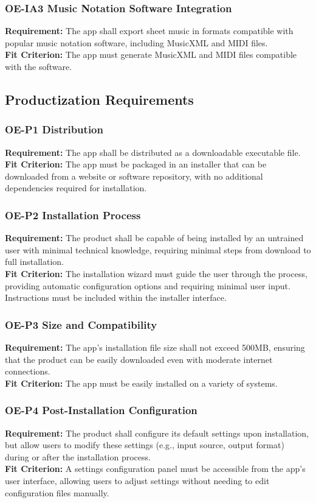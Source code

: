 \documentclass[12pt]{article}
\begin{document}
\subsubsection*{OE-IA3 Music Notation Software Integration}
\textbf{Requirement:} The app shall export sheet music in formats compatible with popular music notation software, including MusicXML and MIDI files.\\
\textbf{Fit Criterion:} The app must generate MusicXML and MIDI files compatible with the software.\\

\subsection{Productization Requirements}
\subsubsection*{OE-P1 Distribution}
\textbf{Requirement:} The app shall be distributed as a downloadable executable file.\\
\textbf{Fit Criterion:} The app must be packaged in an installer that can be downloaded from a website or software repository, with no additional dependencies required for installation.
\subsubsection*{OE-P2 Installation Process}
\textbf{Requirement:} The product shall be capable of being installed by an untrained user with minimal technical knowledge, requiring minimal steps from download to full installation.\\
\textbf{Fit Criterion:} The installation wizard must guide the user through the process, providing automatic configuration options and requiring minimal user input. Instructions must be included within the installer interface.
\subsubsection*{OE-P3 Size and Compatibility}
\textbf{Requirement:} The app’s installation file size shall not exceed 500MB, ensuring that the product can be easily downloaded even with moderate internet connections.\\
\textbf{Fit Criterion:} The app must be easily installed on a variety of systems.
\subsubsection*{OE-P4 Post-Installation Configuration}
\textbf{Requirement:} The product shall configure its default settings upon installation, but allow users to modify these settings (e.g., input source, output format) during or after the installation process.\\
\textbf{Fit Criterion:} A settings configuration panel must be accessible from the app's user interface, allowing users to adjust settings without needing to edit configuration files manually.
\end{document}
